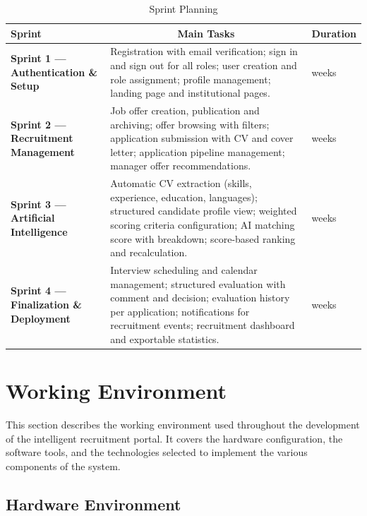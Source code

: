\begin{table}[H]
\centering
\renewcommand{\arraystretch}{1.5}
\begin{tabularx}{\textwidth}{|>{\bfseries\centering\arraybackslash}p{3.8cm}|X|>{\centering\arraybackslash}p{2.2cm}|}
\hline
\rowcolor{headerblue}
\textbf{Sprint} & \multicolumn{1}{c|}{\textbf{Main Tasks}} & \textbf{Duration} \\
\hline
Sprint 1 --- Authentication \& Setup
  & Registration with email verification; sign in and sign out for all roles; user creation and role assignment; profile management; landing page and institutional pages.
  & 4 weeks \\
\hline
Sprint 2 --- Recruitment Management
  & Job offer creation, publication and archiving; offer browsing with filters; application submission with CV and cover letter; application pipeline management; manager offer recommendations.
  & 4 weeks \\
\hline
Sprint 3 --- Artificial Intelligence
  & Automatic CV extraction (skills, experience, education, languages); structured candidate profile view; weighted scoring criteria configuration; AI matching score with breakdown; score-based ranking and recalculation.
  & 4 weeks \\
\hline
Sprint 4 --- Finalization \& Deployment
  & Interview scheduling and calendar management; structured evaluation with comment and decision; evaluation history per application; notifications for recruitment events; recruitment dashboard and exportable statistics.
  & 4 weeks \\
\hline
\end{tabularx}
\caption{Sprint Planning}
\label{tab:sprints}
\end{table}



\section{Working Environment}

This section describes the working environment used throughout the development of the intelligent recruitment portal. It covers the hardware configuration, the software tools, and the technologies selected to implement the various components of the system.

\subsection{Hardware Environment}

